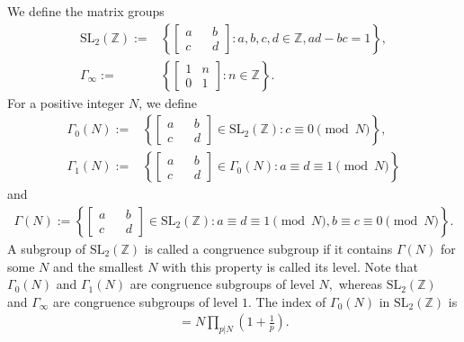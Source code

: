 \documentclass[12pt]{amsart}
\theoremstyle{plain}
\theoremstyle{definition}
\begin{document}
We define the matrix groups
	\begin{align*}
		\mathrm{SL_2}(\mathbb{Z}):= &\left\{ \begin{bmatrix}
			a && b \\c && d
		\end{bmatrix}: a, b, c, d \in \mathbb{Z}, ad-bc=1 \right\},\\
		\Gamma_{\infty}:= &\left\{\begin{bmatrix}
			1 &n\\ 0&1	\end{bmatrix}: n \in \mathbb{Z}\right\}.
	\end{align*}
	For a positive integer $N$, we define
	\begin{align*}
		\Gamma_{0}(N):=& \left\{ \begin{bmatrix}
			a && b \\c && d
		\end{bmatrix} \in \mathrm{SL_2}(\mathbb{Z}) : c\equiv0 \pmod N \right\},\\
		\Gamma_{1}(N):=& \left\{ \begin{bmatrix}
			a && b \\c && d
		\end{bmatrix} \in \Gamma_{0}(N) : a\equiv d  \equiv 1 \pmod N \right\}
	\end{align*}
	and 
	\begin{align*}
		\Gamma(N):= \left\{ \begin{bmatrix}
			a && b \\c && d
		\end{bmatrix} \in \mathrm{SL_2}(\mathbb{Z}) : a\equiv d  \equiv 1 \pmod N,  b \equiv c  \equiv 0 \pmod N \right\}.
	\end{align*}
	A subgroup of $\mathrm{SL_2}(\mathbb{Z})$ is called a congruence subgroup if it contains $ \Gamma(N)$ for some $N$ and the smallest $N$ with this property is called its level. Note that $ \Gamma_{0}(N)$ and $ \Gamma_{1}(N)$ are congruence subgroups of level $N,$ whereas $ \mathrm{SL_2}(\mathbb{Z}) $ and $\Gamma_{\infty}$ are congruence subgroups of level $1.$ The index of $\Gamma_0(N)$ in $\mathrm{SL_2}(\mathbb{Z})$ is 
	\begin{align*}
		[\mathrm{SL_2}(\mathbb{Z}):\Gamma_0(N)]=N\prod\limits_{p|N}\left(1+\frac 1p\right).
	\end{align*}
\end{document}

